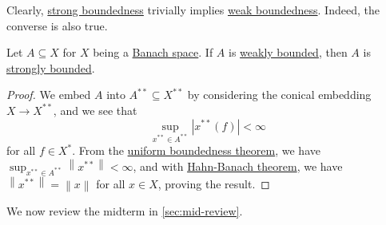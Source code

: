 Clearly, \hyperref[def:strongly-bounded]{strong boundedness} trivially implies \hyperref[def:weakly-bounded]{weak boundedness}. Indeed, the converse is also true.

\begin{corollary}\label{col:weak-bd-implies-strong-bd}
	Let \(A \subseteq X\) for \(X\) being a \hyperref[def:Banach-space]{Banach space}. If \(A\) is \hyperref[def:weakly-bounded]{weakly bounded}, then \(A\) is \hyperref[def:strongly-bounded]{strongly bounded}.
\end{corollary}
\begin{proof}
	We embed \(A\) into \(A^{\ast\ast} \subseteq X^{\ast\ast} \) by considering the conical embedding \(X\to X^{\ast\ast}\), and we see that
	\[
		\sup _{x^{\ast\ast}\in A^{\ast\ast}} \left\vert x^{\ast\ast} (f) \right\vert < \infty
	\]
	for all \(f\in X^{\ast} \). From the \hyperref[thm:uniform-boundedness]{uniform boundedness theorem}, we have \(\sup _{x^{\ast\ast} \in A^{\ast\ast} }\left\lVert x^{\ast\ast} \right\rVert < \infty \), and with \hyperref[thm:Hahn-Banach]{Hahn-Banach theorem}, we have \(\left\lVert x^{\ast\ast} \right\rVert = \left\lVert x\right\rVert \) for all \(x\in X\), proving the result.
\end{proof}

We now review the midterm in \autoref{sec:mid-review}.
